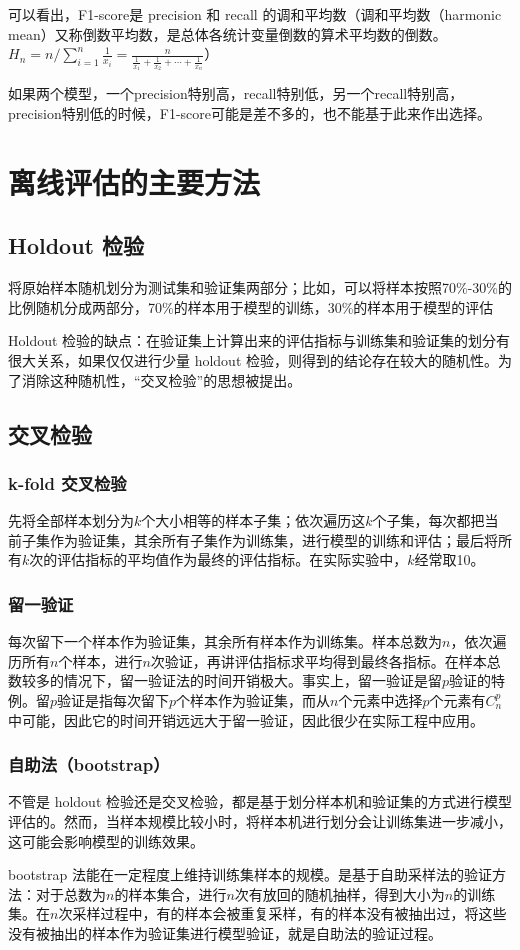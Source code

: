 \documentclass[12pt]{article}
\begin{document}
可以看出，F1-score是 precision 和 recall 的调和平均数（调和平均数（harmonic mean）又称倒数平均数，是总体各统计变量倒数的算术平均数的倒数。$H_n = n/\sum_{i=1}^n\frac{1}{x_i} = \frac{n}{\frac{1}{x_1} + \frac{1}{x_2} + \cdots + \frac{1}{x_n}}$）

如果两个模型，一个precision特别高，recall特别低，另一个recall特别高，precision特别低的时候，F1-score可能是差不多的，也不能基于此来作出选择。

\section{离线评估的主要方法\cite{Deep_Learning_Recommender_System}}
\subsection{Holdout 检验}
将原始样本随机划分为测试集和验证集两部分；比如，可以将样本按照70\%-30\%的比例随机分成两部分，70\%的样本用于模型的训练，30\%的样本用于模型的评估

Holdout 检验的缺点：在验证集上计算出来的评估指标与训练集和验证集的划分有很大关系，如果仅仅进行少量 holdout 检验，则得到的结论存在较大的随机性。为了消除这种随机性，“交叉检验”的思想被提出。

\subsection{交叉检验}
\subsubsection{k-fold 交叉检验}
先将全部样本划分为$k$个大小相等的样本子集；依次遍历这$k$个子集，每次都把当前子集作为验证集，其余所有子集作为训练集，进行模型的训练和评估；最后将所有$k$次的评估指标的平均值作为最终的评估指标。在实际实验中，$k$经常取10。

\subsubsection{留一验证}
每次留下一个样本作为验证集，其余所有样本作为训练集。样本总数为$n$，依次遍历所有$n$个样本，进行$n$次验证，再讲评估指标求平均得到最终各指标。在样本总数较多的情况下，留一验证法的时间开销极大。事实上，留一验证是留$p$验证的特例。留$p$验证是指每次留下$p$个样本作为验证集，而从$n$个元素中选择$p$个元素有$C_n^p$中可能，因此它的时间开销远远大于留一验证，因此很少在实际工程中应用。

\subsubsection{自助法（bootstrap）}
不管是 holdout 检验还是交叉检验，都是基于划分样本机和验证集的方式进行模型评估的。然而，当样本规模比较小时，将样本机进行划分会让训练集进一步减小，这可能会影响模型的训练效果。

bootstrap 法能在一定程度上维持训练集样本的规模。是基于自助采样法的验证方法：对于总数为$n$的样本集合，进行$n$次有放回的随机抽样，得到大小为$n$的训练集。在$n$次采样过程中，有的样本会被重复采样，有的样本没有被抽出过，将这些没有被抽出的样本作为验证集进行模型验证，就是自助法的验证过程。



\end{document}
